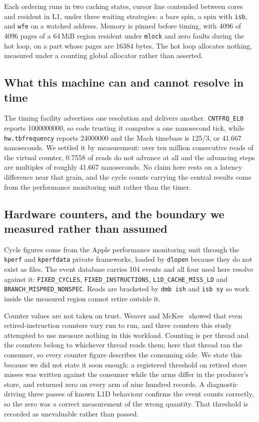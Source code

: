 \documentclass[conference]{IEEEtran}
\begin{document}
Each ordering runs in two caching states, cursor line contended between cores
and resident in L1, under three waiting strategies: a bare spin, a spin with
\texttt{isb}, and \texttt{wfe} on a watched address. Memory is pinned before
timing, with 4096 of 4096 pages of a 64\,MiB region resident under
\texttt{mlock} and zero faults during the hot loop, on a part whose pages are
16384 bytes. The hot loop allocates nothing, measured under a counting global
allocator rather than asserted.

\subsection{What this machine can and cannot resolve in time}

The timing facility advertises one resolution and delivers another.
\texttt{CNTFRQ\_EL0} reports 1000000000, so code trusting it computes a one
nanosecond tick, while \texttt{hw.tbfrequency} reports 24000000 and the Mach
timebase is 125/3, or 41.667 nanoseconds. We settled it by measurement: over
ten million consecutive reads of the virtual counter, 0.7558 of reads do not
advance at all and the advancing steps are multiples of roughly 41.667
nanoseconds. No claim here rests on a latency difference near that grain, and
the cycle counts carrying the central results come from the performance
monitoring unit rather than the timer.

\subsection{Hardware counters, and the boundary we measured rather than assumed}

Cycle figures come from the Apple performance monitoring unit through the
\texttt{kperf} and \texttt{kperfdata} private frameworks, loaded by
\texttt{dlopen} because they do not exist as files. The event database carries
104 events and all four used here resolve against it:
\texttt{FIXED\_CYCLES}, \texttt{FIXED\_INSTRUCTIONS},
\texttt{L1D\_CACHE\_MISS\_LD} and \texttt{BRANCH\_MISPRED\_NONSPEC}. Reads are
bracketed by \texttt{dmb ish} and \texttt{isb sy} so work inside the measured
region cannot retire outside it.

Counter values are not taken on trust. Weaver and
McKee~\cite{weaver2008trusted} showed that even retired-instruction counters
vary run to run, and three counters this study attempted to use measure nothing
in this workload. Counting is per thread and the counters belong to whichever
thread reads them; here that thread ran the consumer, so every counter figure
describes the consuming side. We state this because we did not state it soon
enough: a registered threshold on retired store misses was written against the
consumer while the arms differ in the producer's store, and returned zero on
every arm of nine hundred records. A diagnostic driving three passes of known
L1D behaviour confirms the event counts correctly, so the zero was a correct
measurement of the wrong quantity. That threshold is recorded as unevaluable
rather than passed.
\end{document}
